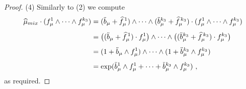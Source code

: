 \documentclass[10pt,a4paper]{amsart}
\begin{document}
\begin{proof}
    \noindent (4) Similarly to (2) we compute
    \begin{equation}
    \begin{aligned}
        \widehat\mu_{\rm mix} \cdot (f_\mu^1 \wedge \cdots \wedge f_\mu^{k_3}) &= (\ddot{b}_\mu  + \widehat{f}_\mu^{\,1}) \wedge \cdots \wedge (\ddot{b}_\mu^{k_{3}} + \widehat{f}_\mu^{\,k_{3}}) \cdot (f_\mu^1 \wedge \cdots \wedge f_\mu^{k_3})\\[4pt]
        &= \big((\ddot{b}_\mu  + \widehat{f}_\mu^{\,1}) \cdot f_\mu^1\big)\wedge \cdots \wedge \big((\ddot{b}_\mu^{k_{3}} + \widehat{f}_\mu^{\,k_{3}}) \cdot f_\mu^{k_3}\big)\\[4pt]
        &= (1 + \ddot{b}_\mu\wedge  f_\mu^1)\wedge \cdots \wedge (1+ \ddot{b}_\mu^{k_{3}}\wedge f_\mu^{k_3})\\[4pt]
        &= \exp(\ddot{b}_\mu^1 \wedge f_\mu^1 + \cdots + \ddot{b}_\mu^{k_3} \wedge f_\mu^{k_3}) \ ,
    \end{aligned}
    \end{equation}
    as required.
\end{proof}
\end{document}
